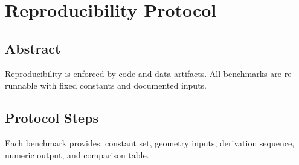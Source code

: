 \documentclass[12pt]{book}
\begin{document}
\chapter{Reproducibility Protocol}

\section*{Abstract}
Reproducibility is enforced by code and data artifacts. All benchmarks are re-runnable with fixed
constants and documented inputs.

\section{Protocol Steps}
Each benchmark provides: constant set, geometry inputs, derivation sequence, numeric output, and
comparison table.
\end{document}
